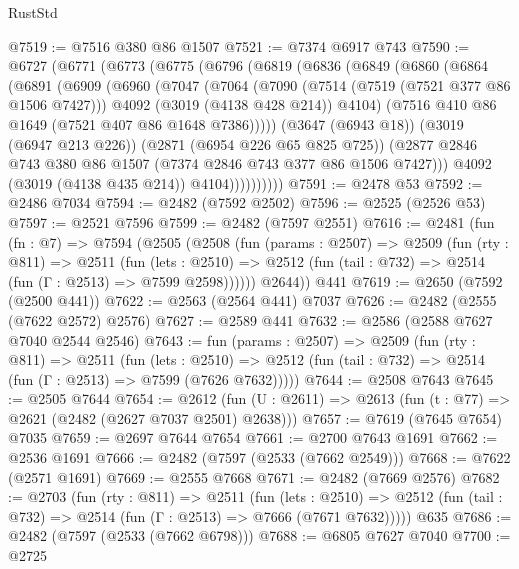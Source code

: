\begin{lexlean}{RustStd}
\begin{coremodule}
@7519 := @7516 @380 @86 @1507
@7521 := @7374 @6917 @743
@7590 := @6727
    (@6771
      (@6773
        (@6775
          (@6796
            (@6819
              (@6836
                (@6849
                  (@6860
                    (@6864
                      (@6891
                        (@6909
                          (@6960
                            (@7047
                              (@7064
                                (@7090
                                  (@7514 (@7519 (@7521 @377 @86 @1506 @7427)))
                                  @4092
                                  (@3019 (@4138 @428 @214))
                                  @4104)
                                (@7516 @410 @86 @1649 (@7521 @407 @86 @1648 @7386)))))
                          (@3647 (@6943 @18))
                          (@3019 (@6947 @213 @226))
                          (@2871 (@6954 @226 @65 @825 @725))
                          (@2877 @2846 @743 @380 @86 @1507 (@7374 @2846 @743 @377 @86 @1506 @7427)))
                        @4092
                        (@3019 (@4138 @435 @214))
                        @4104))))))))))
@7591 := @2478 @53
@7592 := @2486 @7034
@7594 := @2482 (@7592 @2502)
@7596 := @2525 (@2526 @53)
@7597 := @2521 @7596
@7599 := @2482 (@7597 @2551)
@7616 := @2481
    (fun (fn : @7) =>
    @7594
      (@2505
        (@2508
          (fun (params : @2507) =>
          @2509
            (fun (rty : @811) =>
            @2511
              (fun (lets : @2510) =>
              @2512 (fun (tail : @732) => @2514 (fun (Γ : @2513) => @7599 @2598))))))
        @2644))
    @441
@7619 := @2650 (@7592 (@2500 @441))
@7622 := @2563 (@2564 @441) @7037
@7626 := @2482 (@2555 (@7622 @2572) @2576)
@7627 := @2589 @441
@7632 := @2586 (@2588 @7627 @7040 @2544 @2546)
@7643 := fun (params : @2507) =>
  @2509
    (fun (rty : @811) =>
    @2511
      (fun (lets : @2510) =>
      @2512 (fun (tail : @732) => @2514 (fun (Γ : @2513) => @7599 (@7626 @7632)))))
@7644 := @2508 @7643
@7645 := @2505 @7644
@7654 := @2612 (fun (U : @2611) => @2613 (fun (t : @77) => @2621 (@2482 (@2627 @7037 @2501) @2638)))
@7657 := @7619 (@7645 @7654) @7035
@7659 := @2697 @7644 @7654
@7661 := @2700 @7643 @1691
@7662 := @2536 @1691
@7666 := @2482 (@7597 (@2533 (@7662 @2549)))
@7668 := @7622 (@2571 @1691)
@7669 := @2555 @7668
@7671 := @2482 (@7669 @2576)
@7682 := @2703
    (fun (rty : @811) =>
    @2511
      (fun (lets : @2510) =>
      @2512 (fun (tail : @732) => @2514 (fun (Γ : @2513) => @7666 (@7671 @7632)))))
    @635
@7686 := @2482 (@7597 (@2533 (@7662 @6798)))
@7688 := @6805 @7627 @7040
@7700 := @2725

\end{coremodule}
\end{lexlean}
